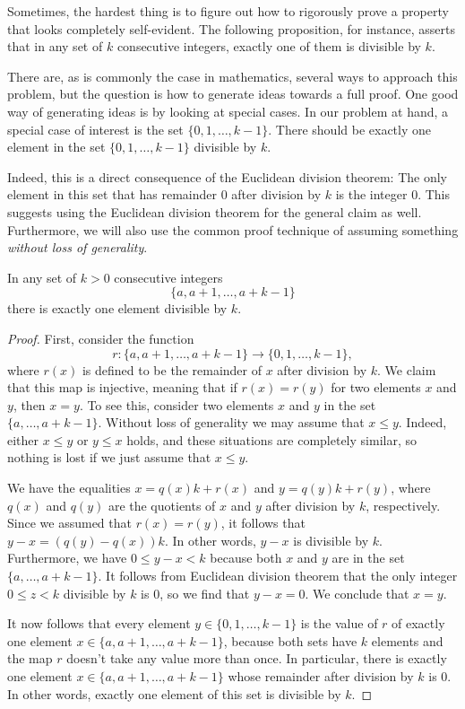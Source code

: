 Sometimes, the hardest thing is to figure out how to rigorously prove a property that looks completely self-evident. The following proposition, for instance, asserts that in any set of $k$ consecutive integers, exactly one of them is divisible by $k$.

There are, as is commonly the case in mathematics, several ways to approach this problem, but the question is how to generate ideas towards a full proof. One good way of generating ideas is by looking at special cases. In our problem at hand, a special case of interest is the set $\{0,1,\ldots,k-1\}$. There should be exactly one element in the set $\{0,1,\ldots,k-1\}$ divisible by $k$.

Indeed, this is a direct consequence of the Euclidean division theorem: The only element in this set that has remainder $0$ after division by $k$ is the integer $0$. This suggests using the Euclidean division theorem for the general claim as well. Furthermore, we will also use the common proof technique of assuming something \emph{without loss of generality}.

\begin{proposition}
  In any set of $k>0$ consecutive integers
  \begin{equation*}
    \{a,a+1,\ldots,a+k-1\}
  \end{equation*}
  there is exactly one element divisible by $k$.
\end{proposition}

\begin{proof}
  First, consider the function
  \begin{equation*}
    r : \{a,a+1,\ldots,a+k-1\} \to \{0,1,\ldots,k-1\},
  \end{equation*}
  where $r(x)$ is defined to be the remainder of $x$ after division by $k$. We claim that this map is injective, meaning that if $r(x)=r(y)$ for two elements $x$ and $y$, then $x=y$. To see this, consider two elements $x$ and $y$ in the set $\{a,\ldots,a+k-1\}$. Without loss of generality we may assume that $x\leq y$. Indeed, either $x\leq y$ or $y\leq x$ holds, and these situations are completely similar, so nothing is lost if we just assume that $x\leq y$.

  We have the equalities $x=q(x)k+r(x)$ and $y=q(y)k+r(y)$, where $q(x)$ and $q(y)$ are the quotients of $x$ and $y$ after division by $k$, respectively. Since we assumed that $r(x)=r(y)$, it follows that $y-x=(q(y)-q(x))k$. In other words, $y-x$ is divisible by $k$. Furthermore, we have $0\leq y-x <k$ because both $x$ and $y$ are in the set $\{a,\ldots,a+k-1\}$. It follows from Euclidean division theorem that the only integer $0\leq z <k$ divisible by $k$ is $0$, so we find that $y-x=0$. We conclude that $x=y$.

  It now follows that every element $y\in\{0,1,\ldots,k-1\}$ is the value of $r$ of exactly one element $x\in\{a,a+1,\ldots,a+k-1\}$, because both sets have $k$ elements and the map $r$ doesn't take any value more than once. In particular, there is exactly one element $x\in\{a,a+1,\ldots,a+k-1\}$ whose remainder after division by $k$ is $0$. In other words, exactly one element of this set is divisible by $k$.
\end{proof}

